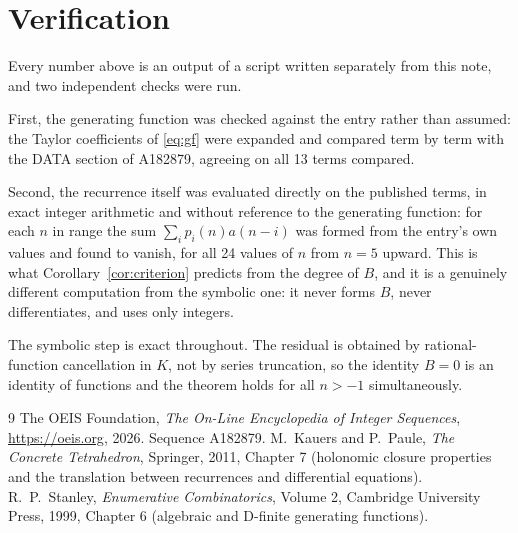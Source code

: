 \documentclass[11pt,a4paper]{article}
\theoremstyle{plain}
\theoremstyle{definition}
\begin{document}
\section{Verification}

Every number above is an output of a script written separately from this note, and two
independent checks were run.

First, the generating function was checked against the entry rather than assumed: the
Taylor coefficients of \eqref{eq:gf} were expanded and compared term by term with the DATA
section of A182879, agreeing on all 13 terms compared.

Second, the recurrence itself was evaluated directly on the published terms, in exact
integer arithmetic and without reference to the generating function: for each $n$ in range
the sum $\sum_{i}p_{i}(n)a(n-i)$ was formed from the entry's own values and found to
vanish, for all 24 values of $n$ from $n=5$ upward. This is what
Corollary~\ref{cor:criterion} predicts from the degree of $B$, and it is a genuinely
different computation from the symbolic one: it never forms $B$, never differentiates, and
uses only integers.

The symbolic step is exact throughout. The residual is obtained by rational-function
cancellation in $K$, not by series truncation, so the identity $B=0$ is an
identity of functions and the theorem holds for all $n>-1$ simultaneously.

\begin{thebibliography}{9}
 The OEIS Foundation, \emph{The On-Line Encyclopedia of Integer Sequences},
\url{https://oeis.org}, 2026. Sequence A182879.
 M.~Kauers and P.~Paule, \emph{The Concrete Tetrahedron}, Springer, 2011,
Chapter 7 (holonomic closure properties and the translation between recurrences and
differential equations).
 R.~P.~Stanley, \emph{Enumerative Combinatorics}, Volume 2, Cambridge
University Press, 1999, Chapter 6 (algebraic and D-finite generating functions).
\end{thebibliography}
\end{document}
